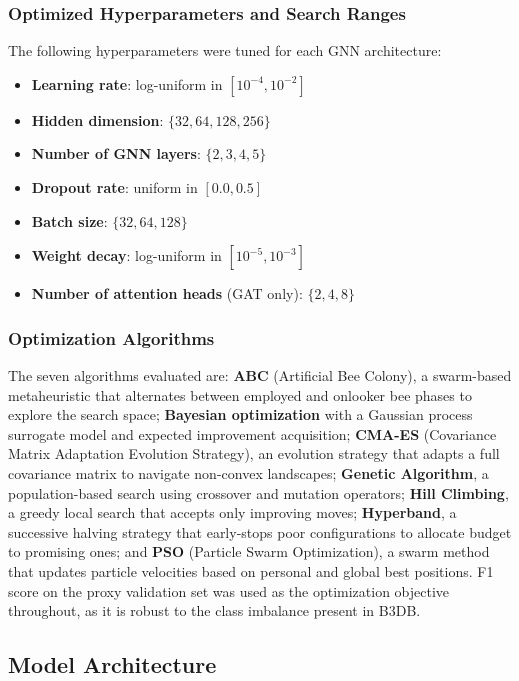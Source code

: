 \documentclass[conference]{IEEEtran}
\begin{document}
\subsubsection{Optimized Hyperparameters and Search Ranges}

The following hyperparameters were tuned for each GNN architecture:
\begin{itemize}
    \item \textbf{Learning rate}: log-uniform in $[10^{-4}, 10^{-2}]$
    \item \textbf{Hidden dimension}: $\{32, 64, 128, 256\}$
    \item \textbf{Number of GNN layers}: $\{2, 3, 4, 5\}$
    \item \textbf{Dropout rate}: uniform in $[0.0, 0.5]$
    \item \textbf{Batch size}: $\{32, 64, 128\}$
    \item \textbf{Weight decay}: log-uniform in $[10^{-5}, 10^{-3}]$
    \item \textbf{Number of attention heads} (GAT only): $\{2, 4, 8\}$
\end{itemize}

\subsubsection{Optimization Algorithms}

The seven algorithms evaluated are:
\textbf{ABC} (Artificial Bee Colony), a swarm-based metaheuristic that
alternates between employed and onlooker bee phases to explore the
search space; \textbf{Bayesian optimization} with a Gaussian process
surrogate model and expected improvement acquisition; \textbf{CMA-ES}
(Covariance Matrix Adaptation Evolution Strategy), an evolution strategy
that adapts a full covariance matrix to navigate non-convex landscapes;
\textbf{Genetic Algorithm}, a population-based search using crossover
and mutation operators; \textbf{Hill Climbing}, a greedy local search
that accepts only improving moves; \textbf{Hyperband}, a successive
halving strategy that early-stops poor configurations to allocate budget
to promising ones; and \textbf{PSO} (Particle Swarm Optimization), a
swarm method that updates particle velocities based on personal and
global best positions. F1 score on the proxy validation set was used as
the optimization objective throughout, as it is robust to the class
imbalance present in B3DB.

\subsection{Model Architecture}
\end{document}
